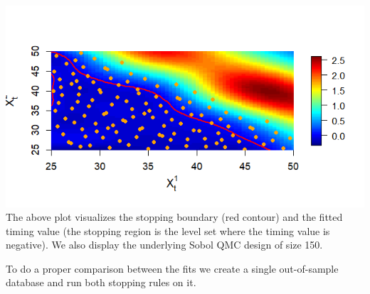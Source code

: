 \documentclass[]{article}
\newenvironment{Shaded}{\begin{snugshade}}{\end{snugshade}}
\newcommand{\KeywordTok}[1]{\textcolor[rgb]{0.13,0.29,0.53}{\textbf{#1}}}
\newcommand{\DataTypeTok}[1]{\textcolor[rgb]{0.13,0.29,0.53}{#1}}
\newcommand{\DecValTok}[1]{\textcolor[rgb]{0.00,0.00,0.81}{#1}}
\newcommand{\StringTok}[1]{\textcolor[rgb]{0.31,0.60,0.02}{#1}}
\newcommand{\CommentTok}[1]{\textcolor[rgb]{0.56,0.35,0.01}{\textit{#1}}}
\newcommand{\ControlFlowTok}[1]{\textcolor[rgb]{0.13,0.29,0.53}{\textbf{#1}}}
\newcommand{\OperatorTok}[1]{\textcolor[rgb]{0.81,0.36,0.00}{\textbf{#1}}}
\newcommand{\NormalTok}[1]{#1}
\begin{document}
\includegraphics{figures/Same-with-GP-1.png} The above plot visualizes
the stopping boundary (red contour) and the fitted timing value (the
stopping region is the level set where the timing value is negative). We
also display the underlying Sobol QMC design of size 150.

To do a proper comparison between the fits we create a single
out-of-sample database and run both stopping rules on it.

\begin{Shaded}
\end{Shaded}
\end{document}
